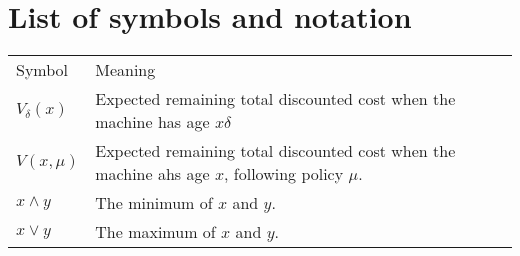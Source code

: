 \chapter{List of symbols and notation}\label{AppendixSymbolsAndNotation}
\begin{table}[]
	\begin{tabular}{ll}
		Symbol        & Meaning                                                                                        \\
		$V_\delta(x)$ & Expected remaining total discounted cost when the machine has age $x\delta$                    \\
		$V(x,\mu)$    & Expected remaining total discounted cost when the machine ahs age $x$, following policy $\mu$. \\
		$x\wedge y$   & The minimum of $x$ and $y$.                                                                    \\
		$x\vee y$     & The maximum of $x$ and $y$.
	\end{tabular}
\end{table}
